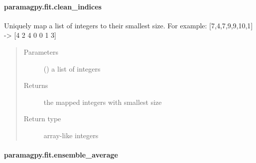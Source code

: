 \documentclass[a4paper,10pt,english]{sphinxmanual}
\begin{document}
\paragraph{paramagpy.fit.clean\_indices}
\label{\detokenize{reference/generated/paramagpy.fit.clean_indices:paramagpy-fit-clean-indices}}\label{\detokenize{reference/generated/paramagpy.fit.clean_indices::doc}}

\begin{fulllineitems}
\label{\detokenize{reference/generated/paramagpy.fit.clean_indices:paramagpy.fit.clean_indices}}
Uniquely map a list of integers to their smallest size.
For example: {[}7,4,7,9,9,10,1{]} -\textgreater{} {[}4 2 4 0 0 1 3{]}
\begin{quote}\begin{description}
\item[{Parameters}] \leavevmode
{} () \textendash{} a list of integers

\item[{Returns}] \leavevmode
{} \textendash{} the mapped integers with smallest size

\item[{Return type}] \leavevmode
array-like integers

\end{description}\end{quote}

\end{fulllineitems}



\paragraph{paramagpy.fit.ensemble\_average}
\label{\detokenize{reference/generated/paramagpy.fit.ensemble_average:paramagpy-fit-ensemble-average}}\label{\detokenize{reference/generated/paramagpy.fit.ensemble_average::doc}}

\begin{fulllineitems}
\label{\detokenize{reference/generated/paramagpy.fit.ensemble_average:paramagpy.fit.ensemble_average}}
\end{fulllineitems}
\end{document}

